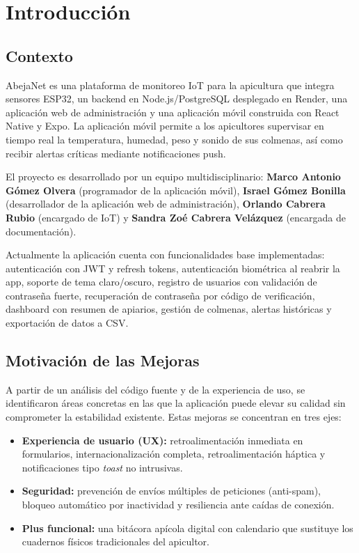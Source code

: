 \section{Introducción}

\subsection{Contexto}

AbejaNet es una plataforma de monitoreo IoT para la apicultura que integra sensores ESP32, un backend en Node.js/PostgreSQL desplegado en Render, una aplicación web de administración y una aplicación móvil construida con React Native y Expo. La aplicación móvil permite a los apicultores supervisar en tiempo real la temperatura, humedad, peso y sonido de sus colmenas, así como recibir alertas críticas mediante notificaciones push.

El proyecto es desarrollado por un equipo multidisciplinario: \textbf{Marco Antonio Gómez Olvera} (programador de la aplicación móvil), \textbf{Israel Gómez Bonilla} (desarrollador de la aplicación web de administración), \textbf{Orlando Cabrera Rubio} (encargado de IoT) y \textbf{Sandra Zoé Cabrera Velázquez} (encargada de documentación).

Actualmente la aplicación cuenta con funcionalidades base implementadas: autenticación con JWT y refresh tokens, autenticación biométrica al reabrir la app, soporte de tema claro/oscuro, registro de usuarios con validación de contraseña fuerte, recuperación de contraseña por código de verificación, dashboard con resumen de apiarios, gestión de colmenas, alertas históricas y exportación de datos a CSV.

\subsection{Motivación de las Mejoras}

A partir de un análisis del código fuente y de la experiencia de uso, se identificaron áreas concretas en las que la aplicación puede elevar su calidad sin comprometer la estabilidad existente. Estas mejoras se concentran en tres ejes:

\begin{itemize}[leftmargin=*]
  \item \textbf{Experiencia de usuario (UX):} retroalimentación inmediata en formularios, internacionalización completa, retroalimentación háptica y notificaciones tipo \textit{toast} no intrusivas.
  \item \textbf{Seguridad:} prevención de envíos múltiples de peticiones (anti-spam), bloqueo automático por inactividad y resiliencia ante caídas de conexión.
  \item \textbf{Plus funcional:} una bitácora apícola digital con calendario que sustituye los cuadernos físicos tradicionales del apicultor.
\end{itemize}

